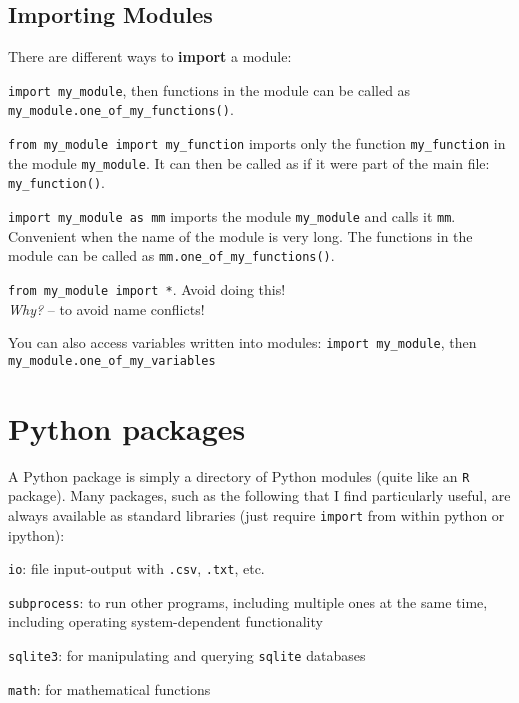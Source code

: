\subsection{Importing Modules}

There are different ways to {\bf import} a module:
\begin{compactitem}
  \item {\tt import my\_module}, then functions in the module can be called
as \\ {\tt my\_module.one\_of\_my\_functions()}.
  \item {\tt from my\_module import my\_function} imports only the
function {\tt my\_function} in the module {\tt my\_module}. It can then be
called as if it were part of the main file: {\tt my\_function()}.
  \item {\tt import my\_module as mm} imports the module
    {\tt my\_module} and calls it {\tt mm}. Convenient when the name of
the module is very long. The functions in the module can be called as
    {\tt mm.one\_of\_my\_functions()}.
  \item {\tt from my\_module import *}. Avoid doing this! \\ 
  {\it Why?} -- to avoid name conflicts!

  \item You can also access variables written into modules: {\tt import
my\_module}, then \\ {\tt my\_module.one\_of\_my\_variables}
\end{compactitem}

\section{Python packages}

A Python package is simply a directory of Python modules (quite like an 
{\tt R} package). Many packages, such as the following that I find 
particularly useful, are always available as standard libraries (just 
require {\tt import} from within python or ipython):

\begin{compactitem}
	\item {\tt io}: file input-output with {\tt *.csv}, {\tt *.txt}, etc.
	\item {\tt subprocess}: to run other programs, including multiple ones
at the same time, including operating system-dependent functionality 
	\item {\tt sqlite3}: for manipulating and querying {\tt sqlite}
databases
	\item {\tt math}: for mathematical functions
\end{compactitem}

